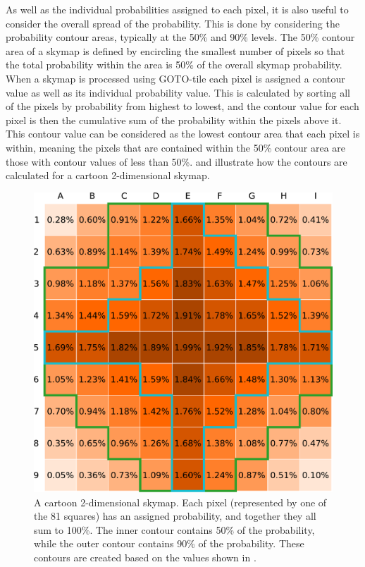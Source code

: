 \begin{colsection}
\begin{colsection}
As well as the individual probabilities assigned to each pixel, it is also useful to consider the overall spread of the probability. This is done by considering the probability contour areas, typically at the 50\% and 90\% levels. The 50\% contour area of a skymap is defined by encircling the smallest number of pixels so that the total probability within the area is 50\% of the overall skymap probability. When a skymap is processed using GOTO-tile each pixel is assigned a contour value as well as its individual probability value. This is calculated by sorting all of the pixels by probability from highest to lowest, and the contour value for each pixel is then the cumulative sum of the probability within the pixels above it. This contour value can be considered as the lowest contour area that each pixel is within, meaning the pixels that are contained within the 50\% contour area are those with contour values of less than 50\%.  and  illustrate how the contours are calculated for a cartoon 2-dimensional skymap.

\makeatletter
\setlength{\@fptop}{1cm}
\makeatother

\begin{figure}[t]
    \begin{center}
        \includegraphics[width=0.95\linewidth]{images/sim/sim_skymap_probs.pdf} %
    \end{center}
    \caption[An example 2D probability skymap]{
        A cartoon 2-dimensional skymap. Each pixel (represented by one of the 81 squares) has an assigned probability, and together they all sum to 100\%. The  inner contour contains 50\% of the probability, while the  outer contour contains 90\% of the probability. These contours are created based on the values shown in .
    }\label{fig:sim_skymap_probs}
\end{figure}


\end{colsection}
\end{colsection}
